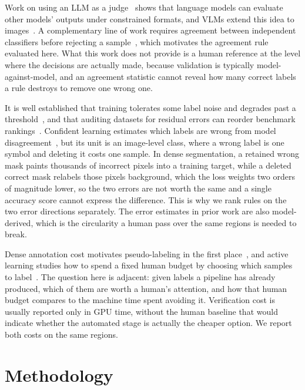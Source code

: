 \documentclass[journal]{IEEEtran}
\begin{document}
Work on using an LLM as a judge~\cite{zheng2023judging} shows that language models can evaluate other models' outputs under constrained formats, and VLMs extend this idea to images~\cite{liu2024llava,ye2023mplug,wang2024qwen2vl}.  
A complementary line of work requires agreement between independent classifiers before rejecting a sample~\cite{malach2017decoupling,han2018co}, which motivates the agreement rule evaluated here.  
What this work does not provide is a human reference at the level where the decisions are actually made, because validation is typically model-against-model, and an agreement statistic cannot reveal how many correct labels a rule destroys to remove one wrong one.

It is well established that training tolerates some label noise and degrades past a threshold~\cite{song2022noisysurvey}, and that auditing datasets for residual errors can reorder benchmark rankings~\cite{northcutt2021labelerrors}.  
Confident learning estimates which labels are wrong from model disagreement~\cite{northcutt2021confident}, but its unit is an image-level class, where a wrong label is one symbol and deleting it costs one sample.  
In dense segmentation, a retained wrong mask paints thousands of incorrect pixels into a training target, while a deleted correct mask relabels those pixels background, which the loss weights two orders of magnitude lower, so the two errors are not worth the same and a single accuracy score cannot express the difference.  
This is why we rank rules on the two error directions separately.  
The error estimates in prior work are also model-derived, which is the circularity a human pass over the same regions is needed to break.

Dense annotation cost motivates pseudo-labeling in the first place~\cite{cordts2016cityscapes}, and active learning studies how to spend a fixed human budget by choosing which samples to label~\cite{settles2009active}.  
The question here is adjacent: given labels a pipeline has already produced, which of them are worth a human's attention, and how that human budget compares to the machine time spent avoiding it.  
Verification cost is usually reported only in GPU time, without the human baseline that would indicate whether the automated stage is actually the cheaper option.  
We report both costs on the same regions.


\section{Methodology}
\label{sec:methodology}
\end{document}
